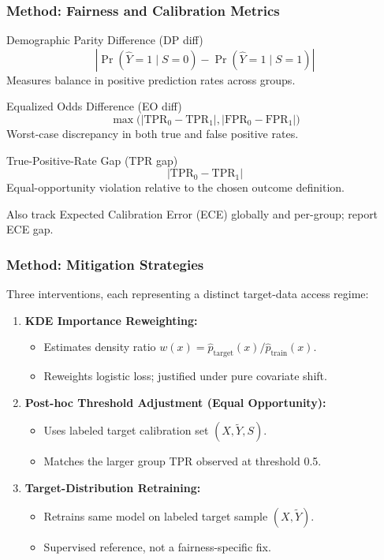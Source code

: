 \documentclass{beamer}
\begin{document}
\begin{frame}
\frametitle{Method: Fairness and Calibration Metrics}
\begin{block}{Demographic Parity Difference (DP diff)}
\[
|\Pr(\hat{Y}=1 \mid S=0) - \Pr(\hat{Y}=1 \mid S=1)|
\]
\small Measures balance in positive prediction rates across groups.
\end{block}

\begin{block}{Equalized Odds Difference (EO diff)}
\[
\max\big(|\text{TPR}_0 - \text{TPR}_1|, |\text{FPR}_0 - \text{FPR}_1|\big)
\]
\small Worst-case discrepancy in both true and false positive rates.
\end{block}

\begin{block}{True-Positive-Rate Gap (TPR gap)}
\[
|\text{TPR}_0 - \text{TPR}_1|
\]
\small Equal-opportunity violation relative to the chosen outcome definition.
\end{block}

\tiny
Also track Expected Calibration Error (ECE) globally and per-group; report ECE gap.

\end{frame}


\begin{frame}
\frametitle{Method: Mitigation Strategies}

Three interventions, each representing a distinct target-data access regime:

\vspace{0.3cm}

\begin{enumerate}
    \item \textbf{KDE Importance Reweighting:}
    \begin{itemize}
        \item Estimates density ratio $w(x)=\hat{p}_{\text{target}}(x)/\hat{p}_{\text{train}}(x)$.
        \item Reweights logistic loss; justified under pure covariate shift.
    \end{itemize}
    
    \item \textbf{Post-hoc Threshold Adjustment (Equal Opportunity):}
    \begin{itemize}
        \item Uses labeled target calibration set $(X,\tilde{Y},S)$.
        \item Matches the larger group TPR observed at threshold 0.5.
    \end{itemize}
    
    \item \textbf{Target-Distribution Retraining:}
    \begin{itemize}
        \item Retrains same model on labeled target sample $(X,\tilde{Y})$.
        \item Supervised reference, not a fairness-specific fix.
    \end{itemize}
\end{enumerate}

\end{frame}
\end{document}
